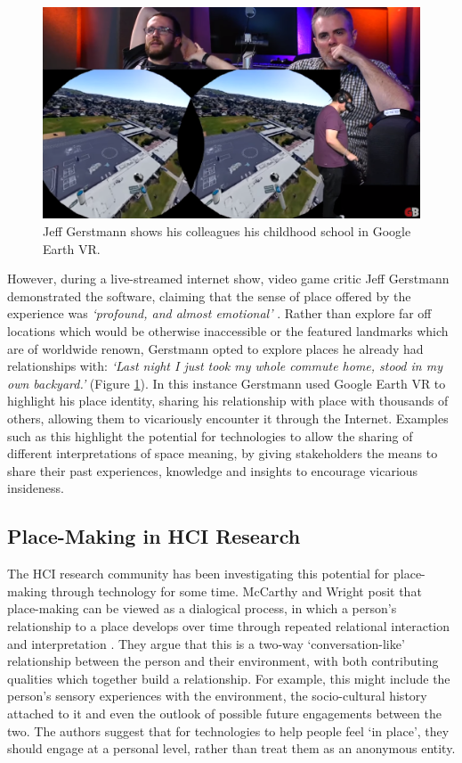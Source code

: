 \begin{figure}
  \centering
  \includegraphics[width=0.8\columnwidth]{images/chapter02/googleEarth.PNG}
  \caption[Jeff Gerstmann showing Google Earth VR]{Jeff Gerstmann shows his colleagues his childhood school in Google Earth VR.}
  \label{fig:googleEarth}
\end{figure}

However, during a live-streamed internet show, video game critic Jeff Gerstmann demonstrated the software, claiming that the sense of place offered by the experience was \textit{`profound, and almost emotional'} \citep{Gerstmann2016}. Rather than explore far off locations which would be otherwise inaccessible or the featured landmarks which are of worldwide renown, Gerstmann opted to explore places he already had relationships with: \textit{`Last night I just took my whole commute home, stood in my own backyard.'} (Figure \ref{fig:googleEarth}). In this instance Gerstmann used Google Earth VR to highlight his place identity, sharing his relationship with place with thousands of others, allowing them to vicariously encounter it through the Internet. Examples such as this highlight the potential for technologies to allow the sharing of different interpretations of space meaning, by giving stakeholders the means to share their past experiences, knowledge and insights to encourage vicarious insideness.

\subsection{Place-Making in HCI Research}
\label{sec:PlaceMakingHCI}

The HCI research community has been investigating this potential for place-making through technology for some time. McCarthy and Wright posit that place-making can be viewed as a dialogical process, in which a person's relationship to a place develops over time through repeated relational interaction and interpretation \citep{McCarthy2005}. They argue that this is a two-way `conversation-like' relationship between the person and their environment, with both contributing qualities which together build a relationship. For example, this might include the person's sensory experiences with the environment, the socio-cultural history attached to it and even the outlook of possible future engagements between the two. The authors suggest that for technologies to help people feel `in place', they should engage at a personal level, rather than treat them as an anonymous entity. 

